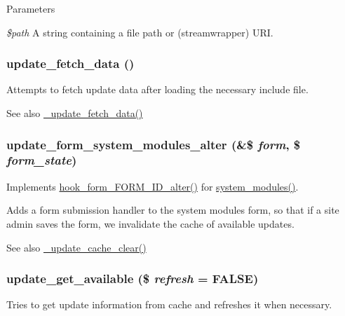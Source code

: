\begin{DoxyParams}{Parameters}
\item[{\em \$path}]A string containing a file path or (streamwrapper) URI. \end{DoxyParams}
\hypertarget{update_8module_a88528fa85108af5a0b26ab5b1d6fa8c2}{
\subsubsection[{update\_\-fetch\_\-data}]{\setlength{\rightskip}{0pt plus 5cm}update\_\-fetch\_\-data ()}}
\label{update_8module_a88528fa85108af5a0b26ab5b1d6fa8c2}
Attempts to fetch update data after loading the necessary include file.

\begin{DoxySeeAlso}{See also}
\hyperlink{update_8fetch_8inc_a3a3122bc6fdfe23091d8db56e4430aeb}{\_\-update\_\-fetch\_\-data()} 
\end{DoxySeeAlso}
\hypertarget{update_8module_ac66abd85c8fc901932b73f874bee871b}{
\subsubsection[{update\_\-form\_\-system\_\-modules\_\-alter}]{\setlength{\rightskip}{0pt plus 5cm}update\_\-form\_\-system\_\-modules\_\-alter (\&\$ {\em form}, \/  \$ {\em form\_\-state})}}
\label{update_8module_ac66abd85c8fc901932b73f874bee871b}
Implements \hyperlink{group__hooks_ga8d4a4089551493d55911bd5c4f218264}{hook\_\-form\_\-FORM\_\-ID\_\-alter()} for \hyperlink{group__forms_gaf4691243ea56e10a971d3d04a94c47b1}{system\_\-modules()}.

Adds a form submission handler to the system modules form, so that if a site admin saves the form, we invalidate the cache of available updates.

\begin{DoxySeeAlso}{See also}
\hyperlink{group__update__status__cache_ga45fc31b5f9949fc0081ed148a9f378dd}{\_\-update\_\-cache\_\-clear()} 
\end{DoxySeeAlso}
\hypertarget{update_8module_a683663ab0739a0d67fe3eb98f532c11c}{
\subsubsection[{update\_\-get\_\-available}]{\setlength{\rightskip}{0pt plus 5cm}update\_\-get\_\-available (\$ {\em refresh} = {\ttfamily FALSE})}}
\label{update_8module_a683663ab0739a0d67fe3eb98f532c11c}
Tries to get update information from cache and refreshes it when necessary.


